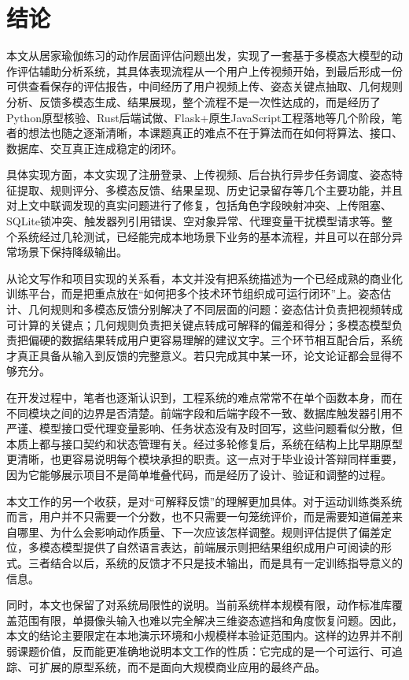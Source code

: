 \chapter*{结论}

本文从居家瑜伽练习的动作层面评估问题出发，实现了一套基于多模态大模型的动作评估辅助分析系统，其具体表现流程从一个用户上传视频开始，到最后形成一份可供查看保存的评估报告，中间经历了用户视频上传、姿态关键点抽取、几何规则分析、反馈多模态生成、结果展现，整个流程不是一次性达成的，而是经历了Python原型核验、Rust后端试做、Flask+原生JavaScript工程落地等几个阶段，笔者的想法也随之逐渐清晰，本课题真正的难点不在于算法而在如何将算法、接口、数据库、交互真正连成稳定的闭环。

具体实现方面，本文实现了注册登录、上传视频、后台执行异步任务调度、姿态特征提取、规则评分、多模态反馈、结果呈现、历史记录留存等几个主要功能，并且对上文中联调发现的真实问题进行了修复，包括角色字段映射冲突、上传阻塞、SQLite锁冲突、触发器列引用错误、空对象异常、代理变量干扰模型请求等。整个系统经过几轮测试，已经能完成本地场景下业务的基本流程，并且可以在部分异常场景下保持降级输出。

从论文写作和项目实现的关系看，本文并没有把系统描述为一个已经成熟的商业化训练平台，而是把重点放在“如何把多个技术环节组织成可运行闭环”上。姿态估计、几何规则和多模态反馈分别解决了不同层面的问题：姿态估计负责把视频转成可计算的关键点；几何规则负责把关键点转成可解释的偏差和得分；多模态模型负责把偏硬的数据结果转成用户更容易理解的建议文字。三个环节相互配合后，系统才真正具备从输入到反馈的完整意义。若只完成其中某一环，论文论证都会显得不够充分。

在开发过程中，笔者也逐渐认识到，工程系统的难点常常不在单个函数本身，而在不同模块之间的边界是否清楚。前端字段和后端字段不一致、数据库触发器引用不严谨、模型接口受代理变量影响、任务状态没有及时回写，这些问题看似分散，但本质上都与接口契约和状态管理有关。经过多轮修复后，系统在结构上比早期原型更清晰，也更容易说明每个模块承担的职责。这一点对于毕业设计答辩同样重要，因为它能够展示项目不是简单堆叠代码，而是经历了设计、验证和调整的过程。

本文工作的另一个收获，是对“可解释反馈”的理解更加具体。对于运动训练类系统而言，用户并不只需要一个分数，也不只需要一句笼统评价，而是需要知道偏差来自哪里、为什么会影响动作质量、下一次应该怎样调整。规则评估提供了偏差定位，多模态模型提供了自然语言表达，前端展示则把结果组织成用户可阅读的形式。三者结合以后，系统的反馈才不只是技术输出，而是具有一定训练指导意义的信息。

同时，本文也保留了对系统局限性的说明。当前系统样本规模有限，动作标准库覆盖范围有限，单摄像头输入也难以完全解决三维姿态遮挡和角度恢复问题。因此，本文的结论主要限定在本地演示环境和小规模样本验证范围内。这样的边界并不削弱课题价值，反而能更准确地说明本文工作的性质：它完成的是一个可运行、可追踪、可扩展的原型系统，而不是面向大规模商业应用的最终产品。

